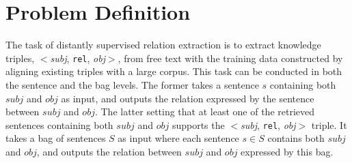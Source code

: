 \section{Problem Definition}
The task of distantly supervised relation extraction is to extract knowledge triples, $<$\emph{subj}, \texttt{rel}, \emph{obj}$>$, from free text with the training data constructed by aligning existing \KB triples with a large corpus.
This task can be conducted in both the sentence and the bag levels.
The former  takes a sentence $s$ containing both $subj$ and $obj$ as input, and outputs the relation expressed
by the sentence between $subj$ and $obj$.
The latter setting
that at least one of the retrieved sentences containing both $subj$ and $obj$ supports the $<$\emph{subj}, \texttt{rel}, \emph{obj}$>$ triple.
It takes a bag of sentences $S$ as input where each sentence
$s\in S$ contains both $subj$ and
$obj$, and outputs  the relation between $subj$ and $obj$ expressed by this bag.


%
